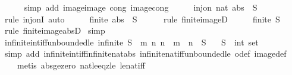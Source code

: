 \begin{isabellebody}
\ \ \ \ \isamarkupfalse%
\ {\isacharparenleft}simp\ add{\isacharcolon}\ image{\isacharunderscore}image\ cong{\isacharcolon}\ image{\isacharunderscore}cong{\isacharparenright}\isanewline
\ \ \isamarkupfalse%
\ \isamarkupfalse%
\ {\isachardoublequoteopen}inj{\isacharunderscore}on\ nat\ {\isacharparenleft}abs\ {\isacharbackquote}\ S{\isacharparenright}{\isachardoublequoteclose}\isanewline
\ \ \ \ \isamarkupfalse%
\ {\isacharparenleft}rule\ inj{\isacharunderscore}onI{\isacharparenright}\ auto\isanewline
\ \ \isamarkupfalse%
\ \isamarkupfalse%
\ {\isachardoublequoteopen}finite\ {\isacharparenleft}abs\ {\isacharbackquote}\ S{\isacharparenright}{\isachardoublequoteclose}\isanewline
\ \ \ \ \isamarkupfalse%
\ {\isacharparenleft}rule\ finite{\isacharunderscore}imageD{\isacharparenright}\isanewline
\ \ \isamarkupfalse%
\ \isamarkupfalse%
\ {\isachardoublequoteopen}finite\ S{\isachardoublequoteclose}\isanewline
\ \ \ \ \isamarkupfalse%
\ {\isacharparenleft}rule\ finite{\isacharunderscore}image{\isacharunderscore}absD{\isacharparenright}\isanewline
{}\isamarkupfalse%
\ simp%
\endisatagproof
{\isafoldproof}%
%
\isadelimproof
\isanewline
%
\endisadelimproof
\isanewline
{}\isamarkupfalse%
\ infinite{\isacharunderscore}int{\isacharunderscore}iff{\isacharunderscore}unbounded{\isacharunderscore}le{\isacharcolon}\ {\isachardoublequoteopen}infinite\ S\ {\isasymlongleftrightarrow}\ {\isacharparenleft}{\isasymforall}m{\isachardot}\ {\isasymexists}n{\isachardot}\ {\isasymbar}n{\isasymbar}\ {\isasymge}\ m\ {\isasymand}\ n\ {\isasymin}\ S{\isacharparenright}{\isachardoublequoteclose}\isanewline
\ \ \ S\ {\isacharcolon}{\isacharcolon}\ {\isachardoublequoteopen}int\ set{\isachardoublequoteclose}\isanewline
%
\isadelimproof
\ \ %
\endisadelimproof
%
\isatagproof
{}\isamarkupfalse%
\ {\isacharparenleft}simp\ add{\isacharcolon}\ infinite{\isacharunderscore}int{\isacharunderscore}iff{\isacharunderscore}infinite{\isacharunderscore}nat{\isacharunderscore}abs\ infinite{\isacharunderscore}nat{\isacharunderscore}iff{\isacharunderscore}unbounded{\isacharunderscore}le\ o{\isacharunderscore}def\ image{\isacharunderscore}def{\isacharparenright}\isanewline
\ \ \ \ {\isacharparenleft}metis\ abs{\isacharunderscore}ge{\isacharunderscore}zero\ nat{\isacharunderscore}le{\isacharunderscore}eq{\isacharunderscore}zle\ le{\isacharunderscore}nat{\isacharunderscore}iff{\isacharparenright}%

\end{isabellebody}
